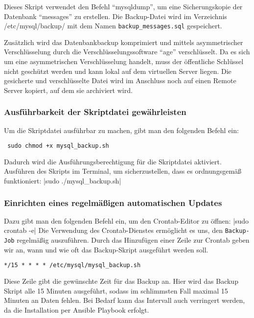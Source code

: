 Dieses Skript verwendet den Befehl \enquote{mysqldump}, um eine Sicherungskopie der Datenbank \enquote{messages} zu erstellen. 
Die Backup-Datei wird im Verzeichnis /etc/mysql/backup/ mit dem Namen \verb+backup_messages.sql+ gespeichert.

Zusätzlich wird das Datenbankbackup komprimiert und mittels asymmetrischer Verschlüsselung durch die Verschlüsselungssoftware \enquote{age} verschlüsselt. Da es sich um eine asymmetrischen Verschlüsselung handelt, muss der öffentliche Schlüssel nicht geschützt werden und kann lokal auf dem virtuellen Server liegen. Die gesicherte und verschlüsselte Datei wird im Anschluss noch auf einen Remote Server kopiert, auf dem sie archiviert wird.

\subsubsection*{Ausführbarkeit der Skriptdatei gewährleisten}

Um die Skriptdatei ausführbar zu machen, gibt man den folgenden Befehl ein:
\begin{verbatim} sudo chmod +x mysql_backup.sh \end{verbatim}
Dadurch wird die Ausführungsberechtigung für die Skriptdatei aktiviert.
Ausführen des Skripts im Terminal, um sicherzustellen, dass es ordnungsgemäß funktioniert:
|sudo ./mysql_backup.sh|

\subsubsection*{Einrichten eines regelmäßigen automatischen Updates}

Dazu gibt man den folgenden Befehl ein, um den Crontab-Editor zu öffnen:
|sudo crontab -e|
Die Verwendung des Crontab-Dienstes ermöglicht es uns, den \verb+Backup-Job+ regelmäßig auszuführen. Durch das Hinzufügen einer Zeile zur Crontab geben wir an, wann und wie oft das Backup-Skript ausgeführt werden soll. 

\begin{verbatim}*/15 * * * * /etc/mysql/mysql_backup.sh\end{verbatim}

Diese Zeile gibt die gewünschte Zeit für das Backup an. Hier wird das Backup Skript alle 15 Minuten ausgeführt, sodass im schlimmsten Fall maximal 15 Minuten an Daten fehlen. Bei Bedarf kann das Intervall auch verringert werden, da die Installation per Ansible Playbook erfolgt.


